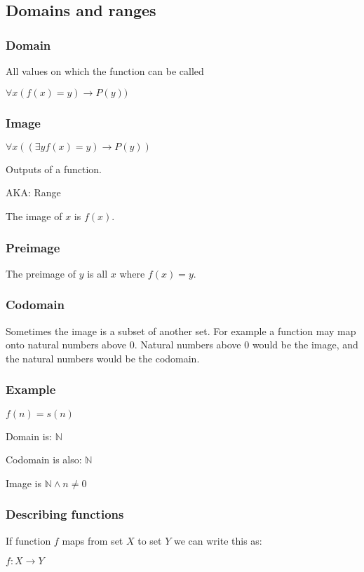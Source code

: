 
\subsection{Domains and ranges}

\subsubsection{Domain}

All values on which the function can be called

$\forall x(f(x)=y)\rightarrow P(y))$

\subsubsection{Image}

$\forall x((\exists y f(x)=y)\rightarrow P(y))$

Outputs of a function.

AKA: Range

The image of \(x\) is \(f(x)\).

\subsubsection{Preimage}

The preimage of \(y\) is all \(x\) where \(f(x)=y\).

\subsubsection{Codomain}

Sometimes the image is a subset of another set. For example a function may map onto natural numbers above \(0\). Natural numbers above \(0\) would be the image, and the natural numbers would be the codomain.

\subsubsection{Example}

$f(n)=s(n)$

Domain is: \(\mathbb{N}\)

Codomain is also: \(\mathbb{N}\)

Image is \(\mathbb{N}\land n\ne 0\)

\subsubsection{Describing  functions}

If function \(f\) maps from set \(X\) to set \(Y\) we can write this as:

$f:X\rightarrow Y$

